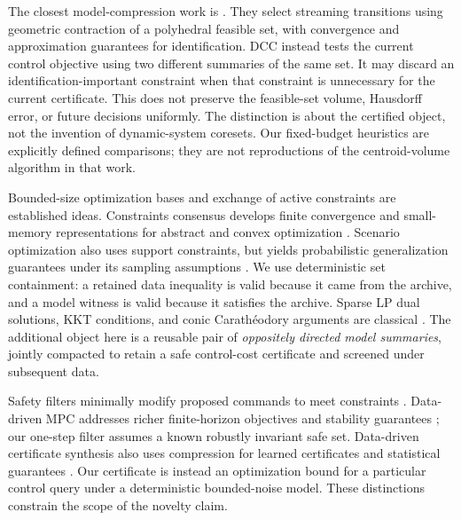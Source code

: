 \documentclass{l4dc2026}
\begin{document}
The closest model-compression work is \citet{li2026coreset}. They select streaming transitions using geometric contraction of a polyhedral feasible set, with convergence and approximation guarantees for identification. DCC instead tests the current control objective using two different summaries of the same set. It may discard an identification-important constraint when that constraint is unnecessary for the current certificate. This does not preserve the feasible-set volume, Hausdorff error, or future decisions uniformly. The distinction is about the certified object, not the invention of dynamic-system coresets. Our fixed-budget heuristics are explicitly defined comparisons; they are not reproductions of the centroid-volume algorithm in that work.

Bounded-size optimization bases and exchange of active constraints are established ideas. Constraints consensus develops finite convergence and small-memory representations for abstract and convex optimization \citep{notarstefano2011,carlone2012}. Scenario optimization also uses support constraints, but yields probabilistic generalization guarantees under its sampling assumptions \citep{calafiore2006}. We use deterministic set containment: a retained data inequality is valid because it came from the archive, and a model witness is valid because it satisfies the archive. Sparse LP dual solutions, KKT conditions, and conic Carath\'eodory arguments are classical \citep{boyd2004}. The additional object here is a reusable pair of \emph{oppositely directed model summaries}, jointly compacted to retain a safe control-cost certificate and screened under subsequent data.

Safety filters minimally modify proposed commands to meet constraints \citep{wabersich2021}. Data-driven MPC addresses richer finite-horizon objectives and stability guarantees \citep{berberich2021}; our one-step filter assumes a known robustly invariant safe set. Data-driven certificate synthesis also uses compression for learned certificates and statistical guarantees \citep{rickard2026}. Our certificate is instead an optimization bound for a particular control query under a deterministic bounded-noise model. These distinctions constrain the scope of the novelty claim.
\end{document}
